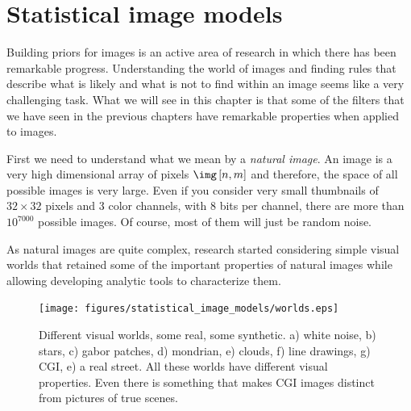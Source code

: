 \chapter{Statistical image models}


Building priors for images is an active area of research in which there has been remarkable progress. Understanding the world of images and finding rules that describe what is likely and what is not to find within an image seems like a very challenging task. What we will see in this chapter is that some of the filters that we have seen in the previous chapters have remarkable properties when applied to images.

First we need to understand what we mean by a {\em natural image}. An image is a very high dimensional array of pixels $\img \left[n,m\right]$ and therefore, the space of all possible images is very large. Even if you consider very small thumbnails of $32\times32$ pixels and 3 color channels, with 8 bits per channel, there are more than $10^{7000}$ possible images. Of course, most of them will just be random noise.

As natural images are quite complex, research started considering simple visual worlds that retained some of the important properties of natural images while allowing developing analytic tools to characterize them.


\begin{figure}[htpb]
  \centerline{
    \texttt{[image: figures/statistical\_image\_models/worlds.eps]}
  }
  \caption{Different visual worlds, some real, some synthetic. a) white noise, b) stars, c) gabor patches, d) mondrian, e) clouds, f) line drawings, g) CGI, e) a real street. All these worlds have different visual properties. Even there is something that makes CGI images distinct from pictures of true scenes.}
  \label{fig:worlds}
\end{figure}


